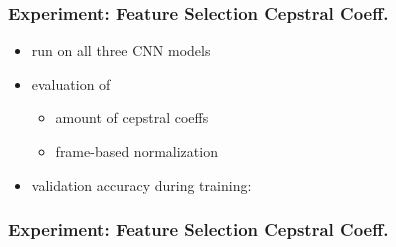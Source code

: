 \begin{frame}
  \frametitle{Experiment: Feature Selection Cepstral Coeff.}
  \begin{itemize}
    \item run on all three CNN models
    \item evaluation of
    \begin{itemize}
     \item amount of cepstral coeffs
     \item frame-based normalization
    \end{itemize}
    \item validation accuracy during training:
  \end{itemize}
  \vspace{-0.5cm}
  \begin{figure}[!ht]
    \centering
  \end{figure}
\end{frame}

\begin{frame}
  \frametitle{Experiment: Feature Selection Cepstral Coeff.}
  \begin{figure}[!ht]
    \centering
  \end{figure}
\end{frame}

